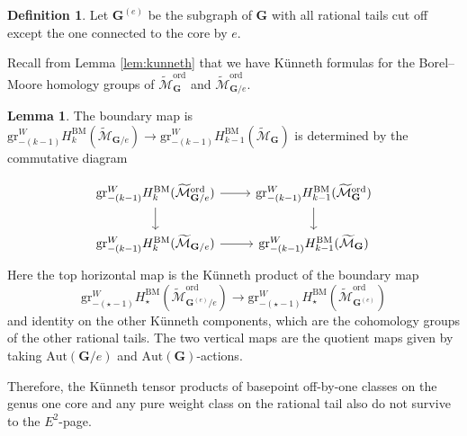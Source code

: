 \documentclass[12pt,reqno]{amsart}
\theoremstyle{definition}
\theoremstyle{definition}
\theoremstyle{definition}
\theoremstyle{definition}
\newtheorem{lemma}[theorem]{Lemma}
\newtheorem{definition}[theorem]{Definition}
\newcommand{\Mtil}{\widetilde{\mathcal{M}}}
\begin{document}
\begin{definition}
  Let $\mathbf{G}^{(e)}$ be the subgraph of $\mathbf{G}$ with all rational tails cut off except the one connected to the core by $e.$
\end{definition}

Recall from Lemma \ref{lem:kunneth} that we have Künneth formulas for the Borel--Moore homology groups of $\Mtil_{\mathbf{G}}^{\mathrm{ord}}$ and $\Mtil_{\mathbf{G}/e}^{\mathrm{ord}}$.

\begin{lemma}\label{lem:kunnss}
  The boundary map is $\mathrm{gr}^W_{-(k-1)}H_{k}^{\mathrm{BM}}(\Mtil_{\mathbf{G}/e})\to \mathrm{gr}^W_{-(k-1)}H_{k-1}^{\mathrm{BM}}(\Mtil_{\mathbf{G}})$ is determined by the commutative diagram

  \[\begin{tikzcd}
	{\mathrm{gr}^W_{-(k-1)}H_{k}^{\mathrm{BM}}(\Mtil_{\mathbf{G}/e}^{\mathrm{ord}})} & {\mathrm{gr}^W_{-(k-1)}H_{k-1}^{\mathrm{BM}}(\Mtil_{\mathbf{G}}^{\mathrm{ord}})} \\
	{\mathrm{gr}^W_{-(k-1)}H_{k}^{\mathrm{BM}}(\Mtil_{\mathbf{G}/e})} & {\mathrm{gr}^W_{-(k-1)}H_{k-1}^{\mathrm{BM}}(\Mtil_{\mathbf{G}})}
	\arrow[from=1-1, to=1-2]
	\arrow[from=1-1, to=2-1]
	\arrow[from=1-2, to=2-2]
	\arrow[from=2-1, to=2-2]
\end{tikzcd}\]
Here the top horizontal map is the Künneth product of the boundary map $$\mathrm{gr}^W_{-(\star-1)}H_{\star}^{\mathrm{BM}}(\Mtil_{\mathbf{G}^{(e)}/e}^{\mathrm{ord}})\to \mathrm{gr}^W_{-(\star-1)}H_{\star}^{\mathrm{BM}}(\Mtil_{\mathbf{G}^{(e)}}^{\mathrm{ord}})$$ and identity on the other Künneth components, which are the cohomology groups of the other rational tails. The two vertical maps are the quotient maps given by taking $\mathrm{Aut}(\mathbf{G}/e)$ and $\mathrm{Aut}(\mathbf{G})$-actions.
\end{lemma}

Therefore, the Künneth tensor products of basepoint off-by-one classes on the genus one core and any pure weight class on the rational tail also do not survive to the $E^2$-page.
\end{document}
